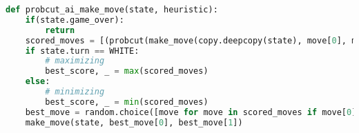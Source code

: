\begin{lstlisting}[language=Python]
def probcut_ai_make_move(state, heuristic):
    if(state.game_over):
        return
    scored_moves = [(probcut(make_move(copy.deepcopy(state), move[0], move[1]), PROBCUT_DEPTH_LIMIT-1, -math.inf, math.inf, heuristic), move) for move in state.possible_moves]
    if state.turn == WHITE:
        # maximizing
        best_score, _ = max(scored_moves)
    else:
        # minimizing
        best_score, _ = min(scored_moves)
    best_move = random.choice([move for move in scored_moves if move[0] == best_score])[1]
    make_move(state, best_move[0], best_move[1])
\end{lstlisting}
